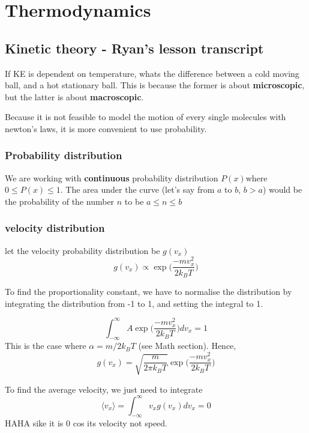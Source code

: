 \chapter{Thermodynamics}
\section{Kinetic theory - Ryan's lesson transcript}
If KE is dependent on temperature, whats the difference between a cold moving ball, and a hot stationary ball. This is because the former is about \textbf{microscopic}, but the latter is about \textbf{macroscopic}. 

Because it is not feasible to model the motion of every single molecules with newton's laws, it is more convenient to use probability.

\subsection{Probability distribution}
We are working with \textbf{continuous} probability distribution $P(x) $where $0 \leq P(x) \leq 1$. The area under the curve (let's say from $a$ to $b$, $b>a$) would be the probability of the number $n$ to be $a\leq n\leq b$

\subsection{velocity distribution}
let the velocity probability distribution be $g(v_x)$
\begin{equation}
    g(v_x)\propto \exp\bigg({\frac{-mv_x^2}{2k_B T}}\bigg)
\end{equation}

To find the proportionality constant, we have to normalise the distribution by integrating the distribution from -1 to 1, and setting the integral to 1.

\begin{equation}
    \int_{-\infty}^{\infty}A\exp\bigg({\frac{-mv_x^2}{2k_B T}}\bigg)dv_x = 1
\end{equation}
This is the case where $\alpha=m/2k_BT$ (see Math section). Hence,
\begin{equation}
    g(v_x)=\sqrt{\frac{m}{2\pi k_B T}}\exp\bigg({\frac{-mv_x^2}{2k_BT}}\bigg)
\end{equation} 

To find the average velocity, we just need to integrate 
\begin{equation}
    \langle v_x \rangle =\int_{-\infty}^{\infty}v_xg(v_x)dv_x=0
\end{equation}
HAHA sike it is 0 cos its velocity not speed.

